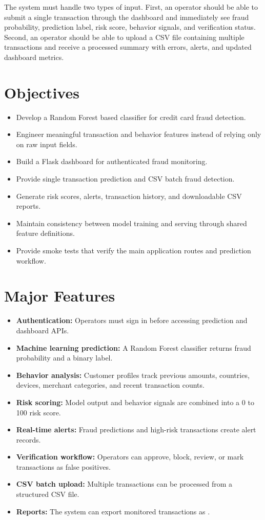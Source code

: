 \documentclass[12pt,a4paper]{report}
\begin{document}
The system must handle two types of input. First, an operator should be able to submit a single transaction through the dashboard and immediately see fraud probability, prediction label, risk score, behavior signals, and verification status. Second, an operator should be able to upload a CSV file containing multiple transactions and receive a processed summary with errors, alerts, and updated dashboard metrics.

\section{Objectives}
\begin{itemize}
    \item Develop a Random Forest based classifier for credit card fraud detection.
    \item Engineer meaningful transaction and behavior features instead of relying only on raw input fields.
    \item Build a Flask dashboard for authenticated fraud monitoring.
    \item Provide single transaction prediction and CSV batch fraud detection.
    \item Generate risk scores, alerts, transaction history, and downloadable CSV reports.
    \item Maintain consistency between model training and serving through shared feature definitions.
    \item Provide smoke tests that verify the main application routes and prediction workflow.
\end{itemize}

\section{Major Features}
\begin{itemize}
    \item \textbf{Authentication:} Operators must sign in before accessing prediction and dashboard APIs.
    \item \textbf{Machine learning prediction:} A Random Forest classifier returns fraud probability and a binary label.
    \item \textbf{Behavior analysis:} Customer profiles track previous amounts, countries, devices, merchant categories, and recent transaction counts.
    \item \textbf{Risk scoring:} Model output and behavior signals are combined into a 0 to 100 risk score.
    \item \textbf{Real-time alerts:} Fraud predictions and high-risk transactions create alert records.
    \item \textbf{Verification workflow:} Operators can approve, block, review, or mark transactions as false positives.
    \item \textbf{CSV batch upload:} Multiple transactions can be processed from a structured CSV file.
    \item \textbf{Reports:} The system can export monitored transactions as .
\end{itemize}
\end{document}

